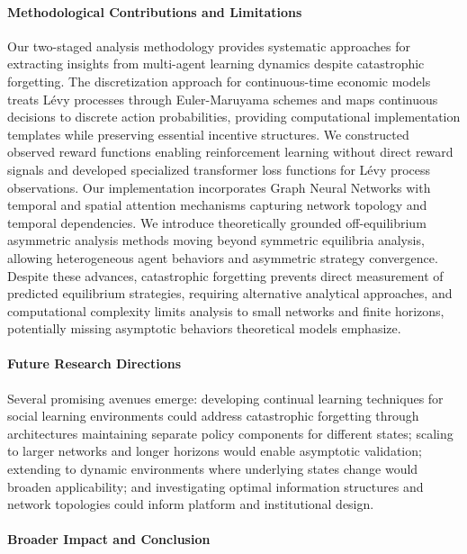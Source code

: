 \paragraph{Methodological Contributions and Limitations}

Our two-staged analysis methodology provides systematic approaches for extracting insights from multi-agent learning dynamics despite catastrophic forgetting. The discretization approach for continuous-time economic models treats Lévy processes through Euler-Maruyama schemes and maps continuous decisions to discrete action probabilities, providing computational implementation templates while preserving essential incentive structures. We constructed observed reward functions enabling reinforcement learning without direct reward signals and developed specialized transformer loss functions for Lévy process observations. Our implementation incorporates Graph Neural Networks with temporal and spatial attention mechanisms capturing network topology and temporal dependencies. We introduce theoretically grounded off-equilibrium asymmetric analysis methods moving beyond symmetric equilibria analysis, allowing heterogeneous agent behaviors and asymmetric strategy convergence. Despite these advances, catastrophic forgetting prevents direct measurement of predicted equilibrium strategies, requiring alternative analytical approaches, and computational complexity limits analysis to small networks and finite horizons, potentially missing asymptotic behaviors theoretical models emphasize.

\paragraph{Future Research Directions}

Several promising avenues emerge: developing continual learning techniques for social learning environments could address catastrophic forgetting through architectures maintaining separate policy components for different states; scaling to larger networks and longer horizons would enable asymptotic validation; extending to dynamic environments where underlying states change would broaden applicability; and investigating optimal information structures and network topologies could inform platform and institutional design.

\paragraph{Broader Impact and Conclusion}

